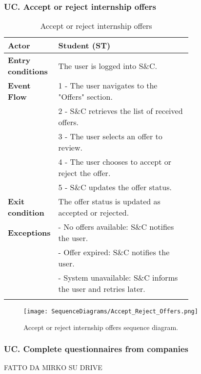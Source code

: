 \subsubsection*{UC\cuc . Accept or reject internship offers}
\begin{center}
    \begin{longtable}{|l|p{0.75\linewidth}|}
        \hline
        \textbf{Actor}            & Student (ST) \\
        \hline
        \textbf{Entry conditions} & The user is logged into S\&C. \\
        \hline
        \textbf{Event Flow}       & 1 - The user navigates to the "Offers" section. \\
        & 2 - S\&C retrieves the list of received offers. \\
        & 3 - The user selects an offer to review. \\
        & 4 - The user chooses to accept or reject the offer. \\
        & 5 - S\&C updates the offer status. \\
        \hline
        \textbf{Exit condition}   & The offer status is updated as accepted or rejected. \\       
        \hline
        \textbf{Exceptions}       & - No offers available: S\&C notifies the user. \\
                                  & - Offer expired: S\&C notifies the user. \\
                                  & - System unavailable: S\&C informs the user and retries later. \\
        \hline
        \caption{Accept or reject internship offers}
        \label{tab:accept_reject_offers_usecase}
    \end{longtable}
\end{center}

\begin{figure}[H]
    \begin{center}
        \texttt{[image: SequenceDiagrams/Accept\_Reject\_Offers.png]}
        \caption{Accept or reject internship offers sequence diagram.}
        \label{fig:accept_reject_offers_seqd}%
    \end{center}
\end{figure}

\subsubsection*{UC\cuc . Complete questionnaires from companies}
FATTO DA MIRKO SU DRIVE


